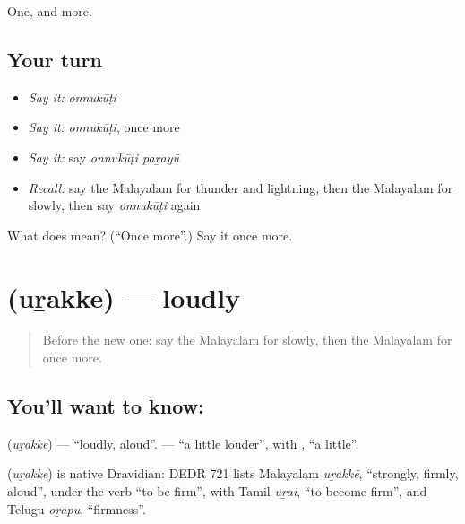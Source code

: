 \begin{grammarlens}[title={What you've built}]
One, and more.
\end{grammarlens}

\subsection*{Your turn}
\begin{itemize}
\raggedright
  \item \emph{Say it:} \emph{onnukūṭi}
  \item \emph{Say it:} \emph{onnukūṭi}, once more
  \item \emph{Say it:} say \emph{onnukūṭi paṟayū}
  \item \emph{Recall:} say the Malayalam for thunder and lightning, then the Malayalam for slowly, then say \emph{onnukūṭi} again
\end{itemize}

\begin{tcolorbox}[breakable,colback=teal!4,colframe=teal!35!black,title={Before you move on}]
What does  mean? (\textquotedblleft{}Once more\textquotedblright{}.) Say it once more.
\end{tcolorbox}
\section[\texorpdfstring{\ml{ഉറക്കെ} (uṟakke)}{ഉറക്കെ (uṟakke)}]{ (uṟakke) — loudly}

\label{lesson:ML-C119-loudly}



\begin{quote}
Before the new one: say the Malayalam for slowly, then the Malayalam for once more.
\end{quote}

\subsection*{You'll want to know: }
\textbf{} (\emph{uṟakke}) — \textquotedblleft{}loudly, aloud\textquotedblright{}. \textbf{ } — \textquotedblleft{}a little louder\textquotedblright{}, with \textbf{}, \textquotedblleft{}a little\textquotedblright{}.

\begin{cousinweb}
\textbf{} (\emph{uṟakke}) is native Dravidian: DEDR 721 lists Malayalam \emph{uṟakkē}, \textquotedblleft{}strongly, firmly, aloud\textquotedblright{}, under the verb \textquotedblleft{}to be firm\textquotedblright{}, with Tamil \emph{uṟai}, \textquotedblleft{}to become firm\textquotedblright{}, and Telugu \emph{oṟapu}, \textquotedblleft{}firmness\textquotedblright{}.
\end{cousinweb}

